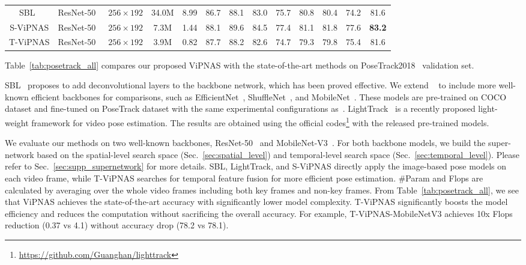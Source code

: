 \documentclass[final]{cvpr}
\begin{document}
\begin{table*}[tb]
\begin{center}
{\begin{tabular}{c|c|c|c|c|cccccccc}
            \hline
			SBL~\cite{xiao2018simple} & ResNet-50~\cite{he2016deep}  & $256 \times 192$ & 34.0M & 8.99  & 86.7 & 88.1 & 83.0 & 75.7 & 80.8 & 80.4 & 74.2 & 81.6 \\ 
			S-ViPNAS & ResNet-50~\cite{he2016deep}  & $256 \times 192$ & 7.3M & 1.44  & 88.1 & 89.6 & 84.5 & 77.4 & 81.1 & 81.8 & 77.6 & \textbf{83.2} \\
            T-ViPNAS & ResNet-50~\cite{he2016deep}  & $256 \times 192$ & 3.9M & 0.82 & 87.7 & 88.2 & 82.6 & 74.7 & 79.3 & 79.8 & 75.4 & 81.6 \\
			 \hline
		\end{tabular}
	}
	\label{tab:posetrack_all}
	\end{center}
	\vspace{-5pt}
\end{table*}

Table~\ref{tab:posetrack_all} compares our proposed ViPNAS with the state-of-the-art methods on  PoseTrack2018~\cite{andriluka2018posetrack} validation set. 

SBL~\cite{xiao2018simple} proposes to add deconvolutional layers to the backbone network, which has been proved effective. We extend ~\cite{xiao2018simple} to include more well-known efficient backbones for comparisons, such as EfficientNet~\cite{tan2019efficientnet}, ShuffleNet~\cite{ma2018shufflenet}, and MobileNet~\cite{howard2019searching}. These models are pre-trained on COCO dataset and fine-tuned on PoseTrack dataset with the same experimental configurations as~\cite{xiao2018simple}. LightTrack~\cite{ning2019lighttrack} is a recently proposed light-weight framework for video pose estimation. The results are obtained using the official codes\footnote{\url{https://github.com/Guanghan/lighttrack}} with the released pre-trained models.

We evaluate our methods on two well-known backbones, \ie ResNet-50~\cite{he2016deep} and MobileNet-V3~\cite{howard2019searching}. For both backbone models, we build the super-network based on the spatial-level search space (Sec.~\ref{sec:spatial_level}) and temporal-level search space (Sec.~\ref{sec:temporal_level}). Please refer to Sec.~\ref{sec:supp_supernetwork} for more details. SBL, LightTrack, and S-ViPNAS directly apply the image-based pose models on each video frame, while T-ViPNAS searches for temporal feature fusion for more efficient pose estimation. \#Param and Flops are calculated by averaging over the whole video frames including both key frames and non-key frames. From Table~\ref{tab:posetrack_all}, we see that ViPNAS achieves the state-of-the-art accuracy with significantly lower model complexity. 
T-ViPNAS significantly boosts the model efficiency and reduces the computation without sacrificing the overall accuracy. For example, T-ViPNAS-MobileNetV3 achieves 10x Flops reduction (0.37 vs 4.1) without accuracy drop (78.2 vs 78.1). 
\end{document}
